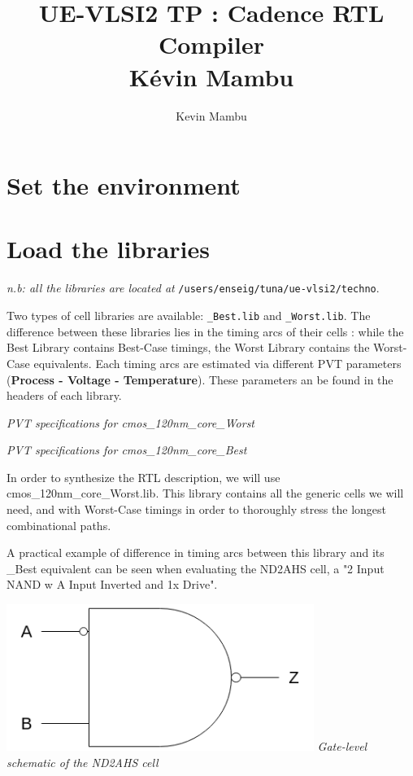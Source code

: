 \documentclass[a4paper]{article}
\author{Kevin Mambu}
\title{UE-VLSI2 TP : Cadence RTL Compiler \\ Kévin Mambu}
\def\code#1{\texttt{#1}}
\begin{document}
\maketitle

\section{Set the environment}




\section{Load the libraries}

{\it n.b: all the libraries are located at} \code{/users/enseig/tuna/ue-vlsi2/techno}.

Two types of cell libraries are available:
\code{\_Best.lib} and \code{\_Worst.lib}. The difference between these libraries
lies in the timing arcs of their cells : while the Best Library contains Best-Case timings,
the Worst Library contains the Worst-Case equivalents. Each timing arcs are estimated via
different PVT parameters (\textbf{Process - Voltage - Temperature}). These parameters an be
found in the headers of each library.


\begin{center}
  \it{PVT specifications for cmos\_120nm\_core\_Worst}
\end{center}

\newpage


\begin{center}
  \it{PVT specifications for cmos\_120nm\_core\_Best}
\end{center}

In order to synthesize the RTL description, we will use cmos\_120nm\_core\_Worst.lib.
This library contains all the generic cells we will need, and with Worst-Case timings
in order to thoroughly stress the longest combinational paths.

A practical example of difference in timing arcs between this library and its \_Best
equivalent can be seen when evaluating the ND2AHS cell, a "2 Input NAND w\/ A Input
Inverted and 1x Drive".

\begin{center}
  \includegraphics[width=10cm]{./nd2ahs.png} \newline
  \it{Gate-level schematic of the ND2AHS cell}
\end{center}
\end{document}
